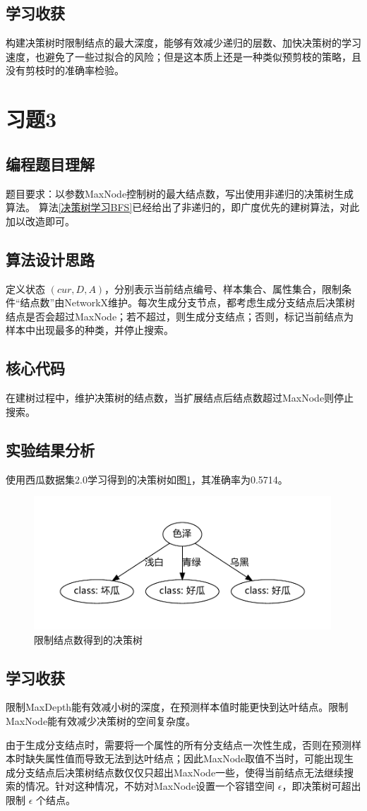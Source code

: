 \documentclass{ctexart}
\begin{document}
	\subsection{学习收获}
	构建决策树时限制结点的最大深度，能够有效减少递归的层数、加快决策树的学习速度，也避免了一些过拟合的风险；但是这本质上还是一种类似预剪枝的策略，且没有剪枝时的准确率检验。
	
	\section{习题3}
	\subsection{编程题目理解}
	题目要求：以参数MaxNode控制树的最大结点数，写出使用非递归的决策树生成算法。
	算法\ref{决策树学习BFS}已经给出了非递归的，即广度优先的建树算法，对此加以改造即可。
	\subsection{算法设计思路}
	定义状态 $(cur,D,A)$，分别表示当前结点编号、样本集合、属性集合，限制条件“结点数”由NetworkX维护。每次生成分支节点，都考虑生成分支结点后决策树结点是否会超过MaxNode；若不超过，则生成分支结点；否则，标记当前结点为样本中出现最多的种类，并停止搜索。
	\subsection{核心代码}
	在建树过程中，维护决策树的结点数，当扩展结点后结点数超过MaxNode则停止搜索。
	
	\subsection{实验结果分析}
	使用西瓜数据集2.0学习得到的决策树如图\ref{MaxNode决策树}，其准确率为0.5714。
	\begin{figure}[!htb]
		\centering
		\includegraphics[scale=1,height=5cm]{../image/limit_MaxNode-Gain-watermelon2.0.gv.pdf}
		\caption{限制结点数得到的决策树}
		\label{MaxNode决策树}
	\end{figure}
	\subsection{学习收获}
	限制MaxDepth能有效减小树的深度，在预测样本值时能更快到达叶结点。限制MaxNode能有效减少决策树的空间复杂度。
	
	由于生成分支结点时，需要将一个属性的所有分支结点一次性生成，否则在预测样本时缺失属性值而导致无法到达叶结点；因此MaxNode取值不当时，可能出现生成分支结点后决策树结点数仅仅只超出MaxNode一些，使得当前结点无法继续搜索的情况。针对这种情况，不妨对MaxNode设置一个容错空间 $\epsilon$，即决策树可超出限制 $\epsilon$ 个结点。
\end{document}
